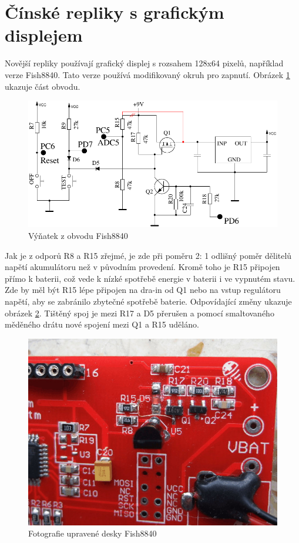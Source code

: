 \section{Čínské repliky s grafickým displejem}
Novější repliky používají grafický displej s rozsahem 128x64 pixelů, například verze Fish8840.
Tato verze používá modifikovaný okruh pro zapnutí. Obrázek \ref{fig:Fish8840} ukazuje část obvodu.

\begin{figure}[H]
\centering
\includegraphics[width=.7\textwidth]{../FIG/Fish8840.pdf}
\caption{Výňatek z obvodu Fish8840}
\label{fig:Fish8840}
\end{figure}

Jak je z odporů R8 a R15 zřejmé, je zde při poměru 2: 1 odlišný poměr dělitelů napětí akumulátoru
než v původním provedení.
Kromě toho je R15 připojen přímo k baterii, což vede k nízké spotřebě energie v baterii
i ve vypnutém stavu. Zde by měl být R15 lépe připojen na dra-in od Q1 nebo na vstup regulátoru napětí, aby
se zabránilo zbytečné spotřebě baterie.
Odpovídající změny ukazuje obrázek \ref{fig:Fish8840patch}. Tištěný spoj je mezi  R17 a D5 přerušen
a pomocí smaltovaného měděného drátu nové spojení mezi Q1 a R15 uděláno.

\begin{figure}[H]
\centering
\includegraphics[width=.7\textwidth]{../PNG/Fish8840patch.jpg}
\caption{Fotografie upravené desky Fish8840}
\label{fig:Fish8840patch}
\end{figure}

